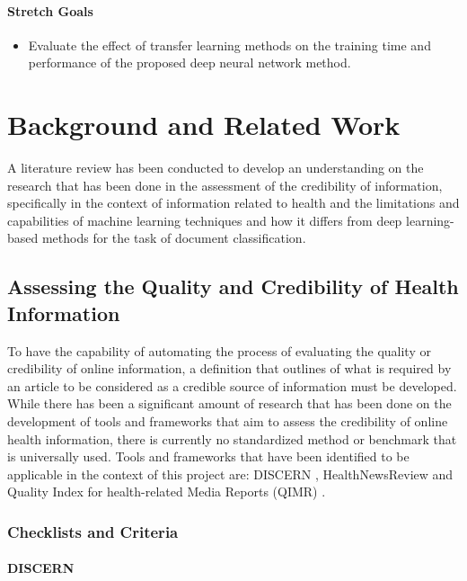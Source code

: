 \documentclass[a4paper,twoside,phd]{BYUPhys}
\begin{document}
\subsubsection{Stretch Goals}
\label{sec:StretchGoals}
\begin{itemize}
	\item Evaluate the effect of transfer learning methods on the training time and performance of the proposed deep neural network method.
\end{itemize}


\chapter{Background and Related Work}
\label{chap:LitReview}

A literature review has been conducted to develop an understanding on the research that has been done in the assessment of the credibility of information, specifically in the context of information related to health and the limitations and capabilities of machine learning techniques and how it differs from deep learning-based methods for the task of document classification. 

\section{Assessing the Quality and Credibility of Health Information}
\label{sec:AssessingInformation}

To have the capability of automating the process of evaluating the quality or credibility of online information, a definition that outlines of what is required by an article to be considered as a credible source of information must be developed. While there has been a significant amount of research that has been done on the development of tools and frameworks that aim to assess the credibility of online health information, there is currently no standardized method or benchmark that is universally used. Tools and frameworks that have been identified to be applicable in the context of this project are: DISCERN \cite{DISCERN}, HealthNewsReview \cite{HealthNewsReview} and Quality Index for health-related Media Reports (QIMR) \cite{QIMR}.

\subsection{Checklists and Criteria}
\label{sec:Checklists}

\subsubsection{DISCERN}
\label{sec:DISCERN}
\end{document}
